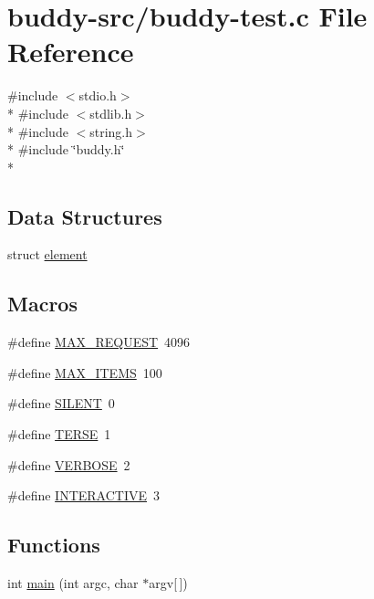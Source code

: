 \hypertarget{buddy-test_8c}{}\section{buddy-\/src/buddy-\/test.c File Reference}
\label{buddy-test_8c}
{\ttfamily \#include $<$stdio.\+h$>$}\\*
{\ttfamily \#include $<$stdlib.\+h$>$}\\*
{\ttfamily \#include $<$string.\+h$>$}\\*
{\ttfamily \#include \char`\"{}buddy.\+h\char`\"{}}\\*
\subsection*{Data Structures}
\begin{DoxyCompactItemize}
\item 
struct \hyperlink{structelement}{element}
\end{DoxyCompactItemize}
\subsection*{Macros}
\begin{DoxyCompactItemize}
\item 
\#define \hyperlink{buddy-test_8c_a79dc55ceff5acfd97aabd01db632a266}{M\+A\+X\+\_\+\+R\+E\+Q\+U\+E\+S\+T}~4096
\item 
\#define \hyperlink{buddy-test_8c_a1b40ceb455086d9cdb68ed3d3bf2775f}{M\+A\+X\+\_\+\+I\+T\+E\+M\+S}~100
\item 
\#define \hyperlink{buddy-test_8c_a404d5107b2cc06d2e236b7320df1fa7d}{S\+I\+L\+E\+N\+T}~0
\item 
\#define \hyperlink{buddy-test_8c_ae70000f46dd84121830128e1701090ee}{T\+E\+R\+S\+E}~1
\item 
\#define \hyperlink{buddy-test_8c_a42f8c497a1968074f38bf5055c650dca}{V\+E\+R\+B\+O\+S\+E}~2
\item 
\#define \hyperlink{buddy-test_8c_aa68dfac40a260bde9272c46bdf82613a}{I\+N\+T\+E\+R\+A\+C\+T\+I\+V\+E}~3
\end{DoxyCompactItemize}
\subsection*{Functions}
\begin{DoxyCompactItemize}
\item 
int \hyperlink{buddy-test_8c_a0ddf1224851353fc92bfbff6f499fa97}{main} (int argc, char $\ast$argv\mbox{[}$\,$\mbox{]})
\end{DoxyCompactItemize}
